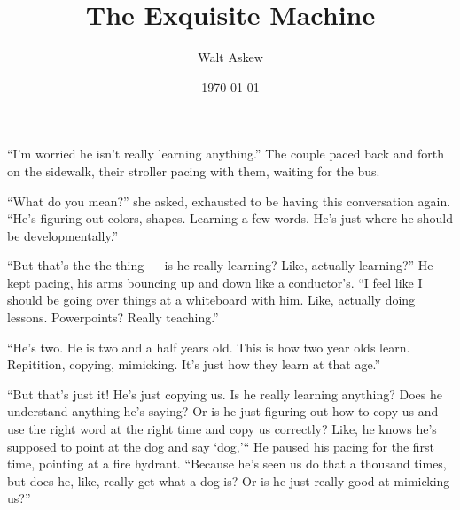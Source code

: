 \documentclass[12pt, oneside]{memoir}
\title{The Exquisite Machine}
\author{Walt Askew}
\date{\today}
\begin{document}
\maketitle

``I'm worried he isn't really learning anything.''
The couple paced back and forth on the sidewalk,
their stroller pacing with them, waiting for the bus.

``What do you mean?'' she asked, exhausted to be having this conversation
again.
``He's figuring out colors, shapes.
Learning a few words.
He's just where he should be developmentally.''

``But that's the the thing --- is he really learning?
Like, actually learning?''
He kept pacing, his arms bouncing up and down like a conductor's.
``I feel like I should be going over things at a whiteboard with him.
Like, actually doing lessons.
Powerpoints?
Really teaching.''

``He's two.
He is two and a half years old.
This is how two year olds learn.
Repitition, copying, mimicking.
It's just how they learn at that age.''

``But that's just it!
He's just copying us.
Is he really learning anything?
Does he understand anything he's saying?
Or is he just figuring out how to copy us and use the right word at
the right time and copy us correctly?
Like, he knows he's supposed to point at the dog and say `dog,'``
He paused his pacing for the first time, pointing at a fire hydrant.
``Because he's seen us do that a thousand times, but does he, like, really get
what a dog is?
Or is he just really good at mimicking us?''
\end{document}
